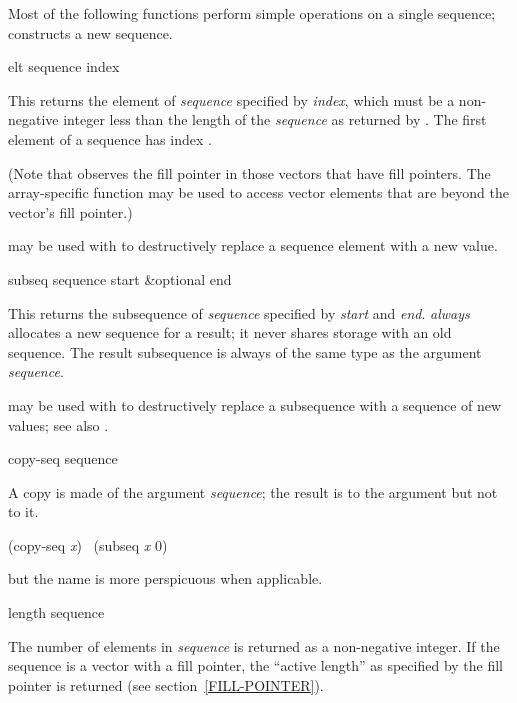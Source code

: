 Most of the following functions perform simple operations on a single
sequence;  constructs a new sequence.

\begin{defun}[Function]
elt sequence index

This returns the element of \emph{sequence} specified by \emph{index},
which must be a non-negative integer less than the length of the \emph{sequence}
as returned by .
The first element of a sequence has index .

(Note that  observes the fill pointer in those vectors that have
fill pointers.  The array-specific function  may be used
to access vector elements that are beyond the vector's fill pointer.)

 may be used with  to destructively replace
a sequence element with a new value.
\end{defun}

\begin{defun}[Function]
subseq sequence start &optional end

This returns the subsequence of \emph{sequence} specified by \emph{start} and
\emph{end}.
 \emph{always} allocates a new sequence for a result; it never
shares storage with an old sequence.  The result subsequence is always of
the same type as the argument \emph{sequence}.

 may be used with  to destructively replace
a subsequence with a sequence of new values; see also .
\end{defun}

\begin{defun}[Function]
copy-seq sequence

A copy is made of the argument \emph{sequence}; the result is 
to the argument but not  to it.
\begin{lisp}
(copy-seq \emph{x}) \EQ\ (subseq \emph{x} 0)
\end{lisp}
but the name  is more perspicuous when applicable.
\end{defun}

\begin{defun}[Function]
length sequence

The number of elements in \emph{sequence} is returned as a non-negative integer.
If the sequence is a vector with a fill pointer,
the ``active length'' as specified by the fill pointer is returned
(see section~\ref{FILL-POINTER}).
\end{defun}

